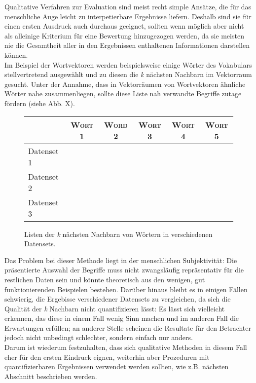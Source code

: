   Qualitative Verfahren zur Evaluation sind meist recht simple Ansätze, die für das menschliche
  Auge leicht zu interpetierbare Ergebnisse liefern. Deshalb sind sie für einen ersten Ausdruck
  auch durchaus geeignet, sollten wenn möglich aber nicht als alleinige Kriterium für eine Bewertung
  hinzugezogen werden, da sie meisten nie die Gesamtheit aller in den Ergebnissen enthaltenen
  Informationen darstellen können. \\
  Im Beispiel der Wortvektoren werden beispielsweise einige Wörter des Vokabulars stellvertretend ausgewählt
  und zu diesen die \emph{k} nächsten Nachbarn im Vektorraum gesucht. Unter der Annahme, dass
  in Vektorräumen von Wortvektoren ähnliche Wörter nahe zusammenliegen, sollte diese Liste nah verwandte
  Begriffe zutage fördern (siehe Abb. X).\\

  \begin{figure}[h]
    \begin{tabular}{l|ccccc}
       & \textsc{Wort 1} & \textsc{Word 2} & \textsc{Wort 3} & \textsc{Wort 4} & \textsc{Wort 5} \\
      \hline \hline
      Datenset 1 & & & & & \\
      \hline
      Datenset 2 & & & & & \\
      \hline
      Datenset 3 & & & & & \\
    \end{tabular}
    \caption{Listen der \emph{k} nächsten Nachbarn von Wörtern in verschiedenen Datensets.}
  \end{figure}

  Das Problem bei dieser Methode liegt in der menschlichen Subjektivität: Die präsentierte Auswahl der Begriffe
  muss nicht zwangsläufig repräsentativ für die restlichen Daten sein und könnte theoretisch aus den wenigen,
  gut funktionierenden Beispielen bestehen. Darüber hinaus bleibt es in einigen Fällen schwierig,
  die Ergebisse verschiedener Datensets zu vergleichen, da sich die Qualität der \emph{k} Nachbarn
  nicht quantifizieren lässt: Es lässt sich vielleicht erkennen, das diese in einem Fall wenig Sinn machen und
  im anderen Fall die Erwartungen erfüllen; an anderer Stelle scheinen die Resultate für den Betrachter jedoch nicht
  unbedingt schlechter, sondern einfach nur anders.\\
  Darum ist wiederum festzuhalten, dass sich qualitative Methoden in diesem Fall eher für den ersten Eindruck
  eignen, weiterhin aber Prozeduren mit quantifizierbaren Ergebnissen verwendet werden sollten, wie z.B.
  nächsten Abschnitt beschrieben werden.


